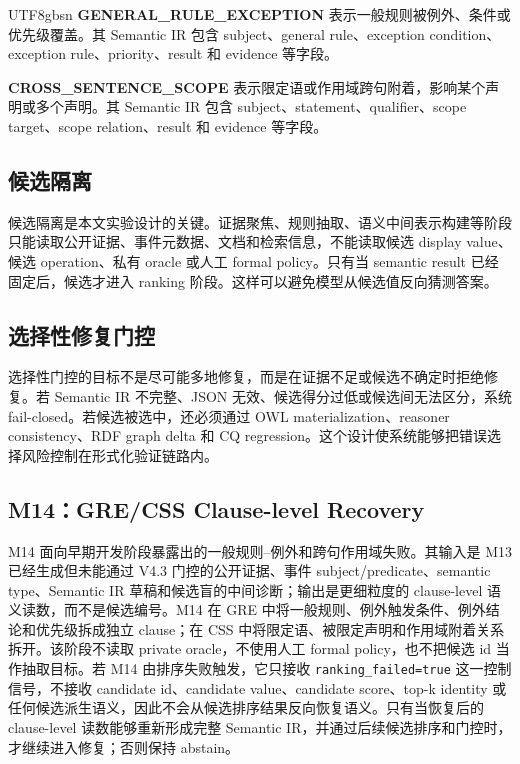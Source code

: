 \documentclass[11pt]{article}
\begin{document}
\begin{CJK*}{UTF8}{gbsn}
\textbf{GENERAL\_RULE\_EXCEPTION} 表示一般规则被例外、条件或优先级覆盖。其 Semantic IR 包含 subject、general rule、exception condition、exception rule、priority、result 和 evidence 等字段。

\textbf{CROSS\_SENTENCE\_SCOPE} 表示限定语或作用域跨句附着，影响某个声明或多个声明。其 Semantic IR 包含 subject、statement、qualifier、scope target、scope relation、result 和 evidence 等字段。

\subsection{候选隔离}

候选隔离是本文实验设计的关键。证据聚焦、规则抽取、语义中间表示构建等阶段只能读取公开证据、事件元数据、文档和检索信息，不能读取候选 display value、候选 operation、私有 oracle 或人工 formal policy。只有当 semantic result 已经固定后，候选才进入 ranking 阶段。这样可以避免模型从候选值反向猜测答案。

\subsection{选择性修复门控}

选择性门控的目标不是尽可能多地修复，而是在证据不足或候选不确定时拒绝修复。若 Semantic IR 不完整、JSON 无效、候选得分过低或候选间无法区分，系统 fail-closed。若候选被选中，还必须通过 OWL materialization、reasoner consistency、RDF graph delta 和 CQ regression。这个设计使系统能够把错误选择风险控制在形式化验证链路内。

\subsection{M14：GRE/CSS Clause-level Recovery}

M14 面向早期开发阶段暴露出的一般规则--例外和跨句作用域失败。其输入是 M13 已经生成但未能通过 V4.3 门控的公开证据、事件 subject/predicate、semantic type、Semantic IR 草稿和候选盲的中间诊断；输出是更细粒度的 clause-level 语义读数，而不是候选编号。M14 在 GRE 中将一般规则、例外触发条件、例外结论和优先级拆成独立 clause；在 CSS 中将限定语、被限定声明和作用域附着关系拆开。该阶段不读取 private oracle，不使用人工 formal policy，也不把候选 id 当作抽取目标。若 M14 由排序失败触发，它只接收 \texttt{ranking\_failed=true} 这一控制信号，不接收 candidate id、candidate value、candidate score、top-k identity 或任何候选派生语义，因此不会从候选排序结果反向恢复语义。只有当恢复后的 clause-level 读数能够重新形成完整 Semantic IR，并通过后续候选排序和门控时，才继续进入修复；否则保持 abstain。


\end{CJK*}
\end{document}
